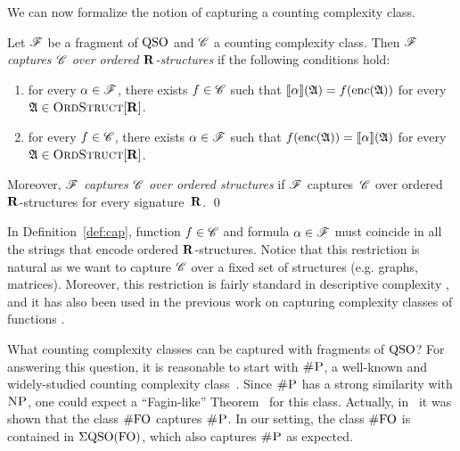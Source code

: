 We can now formalize the notion of capturing a counting complexity class.
\begin{defi} \label{def:cap}
	Let $\mathscr{F}$ be a fragment of ${\rm QSO}$ and $\mathscr{C}$ a counting complexity class. Then {\em  $\mathscr{F}$ captures $\mathscr{C}$ over ordered $\mathbf{R}$-structures} if the  following conditions hold:
	\begin{enumerate}
		\item for every $\alpha \in \mathscr{F}$, there exists $f \in \mathscr{C}$ such that ${\llbracket{}{\alpha}\rrbracket}(\mathfrak{A}) = f({\rm enc}(\mathfrak{A}))$ for every $\mathfrak{A} \in \text{\sc OrdStruct}[\mathbf{R}]$. 
		
		\item for every $f \in \mathscr{C}$, there exists $\alpha \in \mathscr{F}$ such that   $f({\rm enc}(\mathfrak{A})) = {\llbracket{}{\alpha}\rrbracket}(\mathfrak{A})$ for every $\mathfrak{A} \in \text{\sc OrdStruct}[\mathbf{R}]$.
	\end{enumerate} 
	Moreover, {\em $\mathscr{F}$ captures $\mathscr{C}$ over ordered structures} if $\mathscr{F}$ captures~$\mathscr{C}$ over ordered $\mathbf{R}$-structures for every signature~$\mathbf{R}$. \qed
\end{defi}
In Definition~\ref{def:cap}, function $f \in \mathscr{C}$ and formula $\alpha \in \mathscr{F}$ must coincide in all the strings that encode ordered $\mathbf{R}$-structures. Notice that this restriction is natural as we want to capture %
$\mathscr{C}$ over a fixed set of structures (e.g. graphs, matrices).
Moreover, this restriction is fairly standard in descriptive complexity \cite{immerman1999descriptive,L04}, and it has also been used in the previous work on capturing complexity classes of functions \cite{SalujaST95,ComptonG96}.

What counting complexity classes can be captured with fragments of ${\rm QSO}$?
For answering this question, it is reasonable to start with $\text{\sc \#P}$, a well-known and widely-studied counting complexity class~\cite{arora2009computational}. 
Since $\text{\sc \#P}$ has a strong similarity with $\text{\sc NP}$, one could expect a ``Fagin-like'' Theorem~\cite{F75} for this class. 
Actually, in~\cite{SalujaST95} it was shown that the class $\#{\rm FO}$ captures $\text{\sc \#P}$.
In our setting, the class $\#{\rm FO}$ is contained in $\Sigma{\rm QSO}({\rm FO})$, which also captures $\text{\sc \#P}$ as expected.
 
